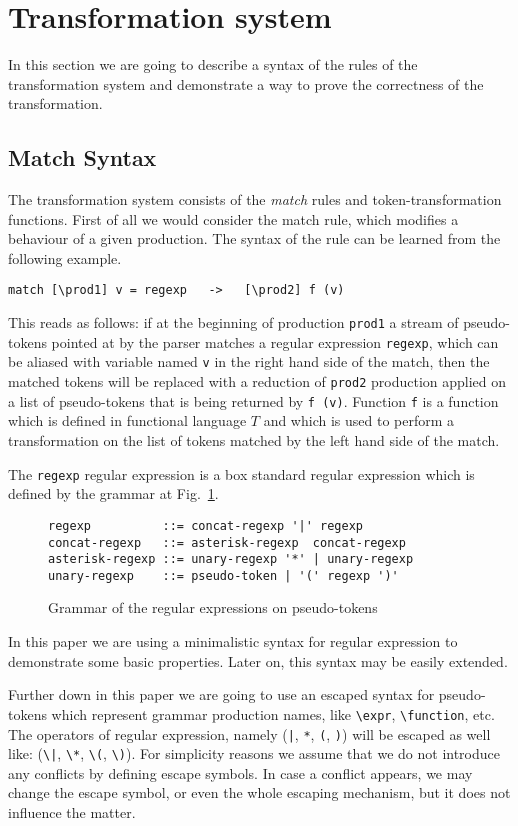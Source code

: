 \section{\label{sec:dynext}Transformation system}

In this section we are going to describe a syntax of the rules of 
the transformation system and demonstrate a way to prove the correctness
of the transformation.

\subsection{Match Syntax}

The transformation system consists of the \textit{match} rules and
token-transformation functions.  First of all we would consider the
match rule, which modifies a behaviour of a given production.  The
syntax of the rule can be learned from the following example.
\begin{verbatim}
match [\prod1] v = regexp   ->   [\prod2] f (v)
\end{verbatim}
This reads as follows: if at the beginning of production \verb|prod1|
a stream of pseudo-tokens pointed at by the parser matches a regular expression
\verb|regexp|, which can be aliased with variable named \verb|v| in the
right hand side of the match, then the matched tokens will be replaced 
with a reduction of \verb|prod2| production applied on a list of 
pseudo-tokens that is being returned by \verb|f (v)|.  Function \verb|f|
is a function which is defined in functional language $T$ and which
is used to perform a transformation on the list of tokens matched by
the left hand side of the match.  

The \verb|regexp| regular expression is a box standard regular
expression which is defined by the grammar at Fig.~\ref{fig:reggram}.
\begin{figure}[h!]
\begin{verbatim}
regexp          ::= concat-regexp '|' regexp
concat-regexp   ::= asterisk-regexp  concat-regexp
asterisk-regexp ::= unary-regexp '*' | unary-regexp
unary-regexp    ::= pseudo-token | '(' regexp ')'
\end{verbatim}
\caption{\label{fig:reggram}Grammar of the regular expressions on
pseudo-tokens}
\end{figure}
In this paper we are using a minimalistic syntax for regular expression
to demonstrate some basic properties.  Later on, this syntax may be 
easily extended.

Further down in this paper we are going to use an escaped syntax 
for pseudo-tokens which represent grammar production names, like
\verb|\expr|, \verb|\function|, etc.  The operators of regular
expression, namely (\verb/|/, \verb|*|, \verb|(|, \verb|)|) will
be escaped as well like: (\verb/\|/, \verb|\*|, \verb|\(|, \verb|\)|).
For simplicity reasons we assume that we do not introduce
any conflicts by defining escape symbols.  In case a conflict 
appears, we may change the escape symbol, or even the whole escaping
mechanism, but it does not influence the matter.

